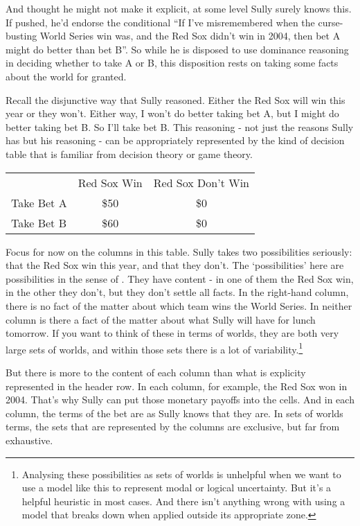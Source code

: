 \documentclass[11pt,]{book}
\let\rmarkdownfootnote\footnote%
\def\footnote{\protect\rmarkdownfootnote}
\def\toprule{}
\def\bottomrule{}
\begin{document}
And thought he might not make it explicit, at some level Sully surely knows this. If pushed, he'd endorse the conditional ``If I've misremembered when the curse-busting World Series win was, and the Red Sox didn't win in 2004, then bet A might do better than bet B''. So while he is disposed to use dominance reasoning in deciding whether to take A or B, this disposition rests on taking some facts about the world for granted.

Recall the disjunctive way that Sully reasoned. Either the Red Sox will win this year or they won't. Either way, I won't do better taking bet A, but I might do better taking bet B. So I'll take bet B. This reasoning - not just the reasons Sully has but his reasoning - can be appropriately represented by the kind of decision table that is familiar from decision theory or game theory.

\begin{longtable}[]{@{}lcc@{}}
\toprule
\endhead
& Red Sox Win & Red Sox Don't Win\tabularnewline
Take Bet A & \$50 & \$0\tabularnewline
Take Bet B & \$60 & \$0\tabularnewline
\bottomrule
\end{longtable}

Focus for now on the columns in this table. Sully takes two possibilities seriously: that the Red Sox win this year, and that they don't. The `possibilities' here are possibilities in the sense of \citet{Humberstone1981}. They have content - in one of them the Red Sox win, in the other they don't, but they don't settle all facts. In the right-hand column, there is no fact of the matter about which team wins the World Series. In neither column is there a fact of the matter about what Sully will have for lunch tomorrow. If you want to think of these in terms of worlds, they are both very large sets of worlds, and within those sets there is a lot of variability.\footnote{Analysing these possibilities as sets of worlds is unhelpful when we want to use a model like this to represent modal or logical uncertainty. But it's a helpful heuristic in most cases. And there isn't anything wrong with using a model that breaks down when applied outside its appropriate zone.}

But there is more to the content of each column than what is explicity represented in the header row. In each column, for example, the Red Sox won in 2004. That's why Sully can put those monetary payoffs into the cells. And in each column, the terms of the bet are as Sully knows that they are. In sets of worlds terms, the sets that are represented by the columns are exclusive, but far from exhaustive.
\end{document}
